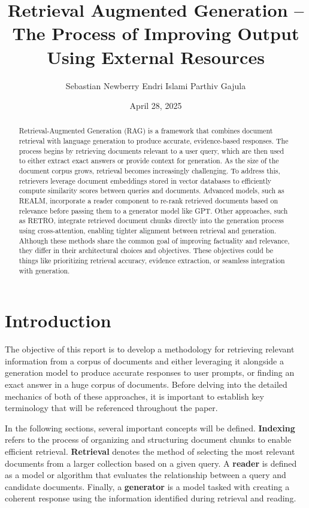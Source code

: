 \documentclass[twocolumn, 10pt]{article}
\title{Retrieval Augmented Generation – The Process of Improving Output Using External Resources}
\author{Sebastian Newberry \quad Endri Islami \quad Parthiv Gajula}
\date{April 28, 2025}
\begin{document}
\setlength{\abovedisplayskip}{6pt}
\setlength{\belowdisplayskip}{6pt}

\maketitle

\begin{abstract}
    Retrieval-Augmented Generation (RAG) is a framework that combines document retrieval with language generation to produce accurate, evidence-based responses. The process begins by retrieving documents relevant to a user query, which are then used to either extract exact answers or provide context for generation. As the size of the document corpus grows, retrieval becomes increasingly challenging. To address this, retrievers leverage document embeddings stored in vector databases to efficiently compute similarity scores between queries and documents. Advanced models, such as REALM, incorporate a reader component to re-rank retrieved documents based on relevance before passing them to a generator model like GPT. Other approaches, such as RETRO, integrate retrieved document chunks directly into the generation process using cross-attention, enabling tighter alignment between retrieval and generation. Although these methods share the common goal of improving factuality and relevance, they differ in their architectural choices and objectives. These objectives could be things like prioritizing retrieval accuracy, evidence extraction, or seamless integration with generation.
\end{abstract}

\section{Introduction}

The objective of this report is to develop a methodology for retrieving relevant information from a corpus of documents and either leveraging it alongside a generation model to produce accurate responses to user prompts, or finding an exact answer in a huge corpus of documents. Before delving into the detailed mechanics of both of these approaches, it is important to establish key terminology that will be referenced throughout the paper.

In the following sections, several important concepts will be defined. \textbf{Indexing} refers to the process of organizing and structuring document chunks to enable efficient retrieval. \textbf{Retrieval} denotes the method of selecting the most relevant documents from a larger collection based on a given query. A \textbf{reader} is defined as a model or algorithm that evaluates the relationship between a query and candidate documents. Finally, a \textbf{generator} is a model tasked with creating a coherent response using the information identified during retrieval and reading.
\end{document}
